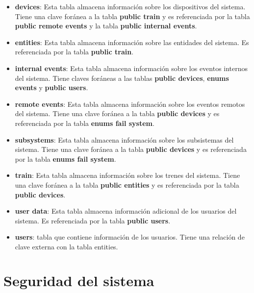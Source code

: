 \begin{itemize}

\item \textbf{devices}: Esta tabla almacena información sobre los dispositivos del sistema. Tiene una clave foránea a la tabla \textbf{public train} y es referenciada por la tabla \textbf{public remote events} y la tabla \textbf{public internal events}.

\item \textbf{entities}: Esta tabla almacena información sobre las entidades del sistema. Es referenciada por la tabla \textbf{public train}.

\item \textbf{internal events}: Esta tabla almacena información sobre los eventos internos del sistema. Tiene claves foráneas a las tablas \textbf{public devices}, \textbf{enums events} y \textbf{public users}.

\item \textbf{remote events}: Esta tabla almacena información sobre los eventos remotos del sistema. Tiene una clave foránea a la tabla \textbf{public devices} y es referenciada por la tabla \textbf{enums fail system}.

\item \textbf{subsystems}: Esta tabla almacena información sobre los subsistemas del sistema. Tiene una clave foránea a la tabla \textbf{public devices} y es referenciada por la tabla \textbf{enums fail system}.

\item \textbf{train}: Esta tabla almacena información sobre los trenes del sistema. Tiene una clave foránea a la tabla \textbf{public entities} y es referenciada por la tabla \textbf{public devices}.

\item \textbf{user data}: Esta tabla almacena información adicional de los usuarios del sistema. Es referenciada por la tabla \textbf{public users}.

\item \textbf{users}: tabla que contiene información de los usuarios. Tiene una relación de clave externa con la tabla entities.


\end{itemize}






\section{Seguridad del sistema}

